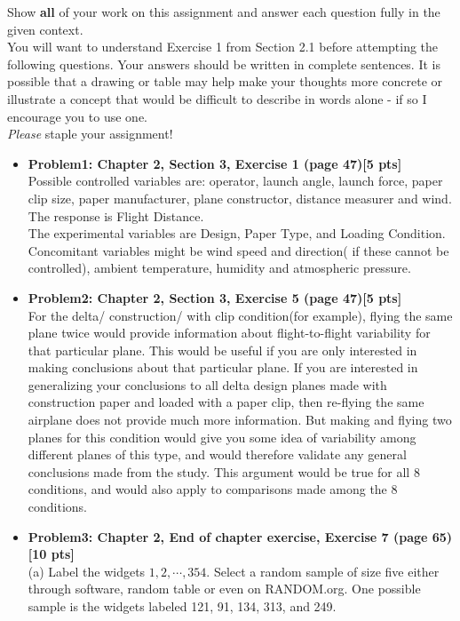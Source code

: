 \documentclass[11pt]{article}\usepackage[]{graphicx}\usepackage[]{color}
\begin{document}
\pagestyle{fancy} 

Show \textbf{all} of your work on this assignment and answer each question fully in the given context. \\
You will want to understand Exercise 1 from Section 2.1 before attempting the following questions.  
Your answers should be written in complete sentences.
It is possible that a drawing or table may help make your thoughts more concrete or illustrate a concept that would be difficult to describe in words alone - if so I encourage you to use one.\\

\emph{Please} staple your assignment!

\begin{itemize}

\item \textbf{Problem1: Chapter 2, Section 3, Exercise 1 (page 47)[5 pts]} \\
Possible controlled variables are: operator, launch angle, launch force, paper clip size, paper manufacturer, plane constructor, distance measurer and wind.\\
The response is Flight Distance.\\
The experimental variables are Design, Paper Type, and Loading Condition. \\
Concomitant variables might be wind speed and direction( if these cannot be controlled), ambient temperature, humidity and atmospheric pressure. 

\item \textbf{Problem2: Chapter 2, Section 3, Exercise 5 (page 47)[5 pts]}\\
For the delta/ construction/ with clip condition(for example), flying the same plane twice would provide information about flight-to-flight variability for that particular plane. This would be useful if you are only interested in making conclusions about that particular plane. If you are interested in generalizing your conclusions to all delta design planes made with construction paper and loaded with a paper clip, then re-flying the same airplane does not provide much more information. But making and flying two planes for this condition would give you some idea of variability among different planes of this type, and would therefore validate any general conclusions made from the study. This argument would be true for all 8 conditions, and would also apply to comparisons made among the 8 conditions. 

\item \textbf{Problem3: Chapter 2, End of chapter exercise, Exercise 7 (page 65)[10 pts]}\\
(a) Label the widgets $ 1, 2, \cdots, 354$. Select a random sample of size five either through software, random table or even on RANDOM.org. One possible sample is the widgets labeled 121, 91, 134, 313, and 249.\\


\end{itemize}
\end{document}

